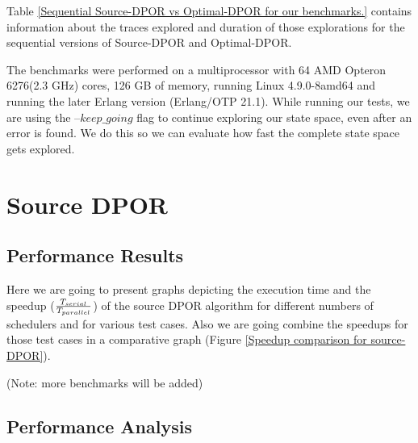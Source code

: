Table \ref{Sequential Source-DPOR vs Optimal-DPOR for our benchmarks.} contains information about the traces explored and duration of those
explorations for the sequential versions of Source-DPOR and Optimal-DPOR.


The benchmarks were performed on a multiprocessor with 64 AMD Opteron 6276(2.3 GHz) cores, 126 GB of memory, running
Linux 4.9.0-8amd64 and running the later Erlang version (Erlang/OTP 21.1). While running our tests, we are using the
--$keep\_going$ flag to continue exploring our state space, even after an error is found. We do this so we can evaluate
how fast the complete state space gets explored.

\section{Source DPOR}

\subsection{Performance Results}

Here we are going to present graphs depicting the execution time and the speedup ($T_{serial} 
\over T_{parallel}$) of the source DPOR algorithm
for different numbers of schedulers and for various test cases. Also we are going combine the 
speedups for those test cases in a comparative graph (Figure \ref{Speedup comparison for source-DPOR}).

(Note: more benchmarks will be added)

\iffalse
\mediumGraph{scripts/indexer15_time.png}{Execution time for indexer 15}
\mediumGraph{scripts/readers15_time.png}{Execution time for readers 15}
\mediumGraph{scripts/writers11_time.png}{Execution time for writers 11}

\mediumGraph{scripts/indexer15_speedup.png}{Speedup for indexer 15}
\mediumGraph{scripts/readers15_speedup.png}{Speedup time for readers 15}
\mediumGraph{scripts/writers11_speedup.png}{Speedup time for writers 11}
\fi

\subsection{Performance Analysis}

